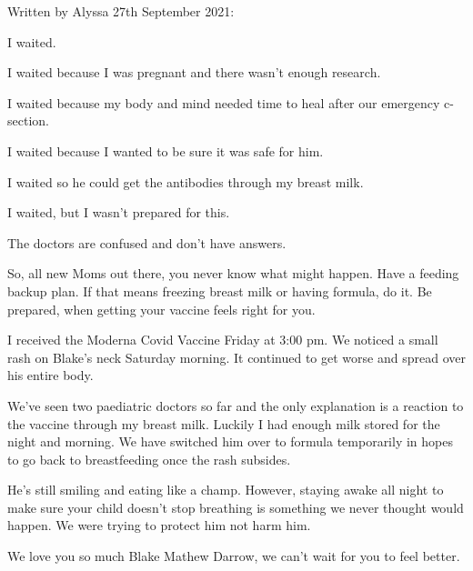 Written by Alyssa 27th September 2021:

I waited.

I waited because I was pregnant and there wasn’t enough research.

I waited because my body and mind needed time to heal after our emergency c-section.

I waited because I wanted to be sure it was safe for him.

I waited so he could get the antibodies through my breast milk.

I waited, but I wasn’t prepared for this.

The doctors are confused and don’t have answers.

So, all new Moms out there, you never know what might happen. Have a feeding
backup plan. If that means freezing breast milk or having formula, do it. Be
prepared, when getting your vaccine feels right for you.

I received the Moderna Covid Vaccine Friday at 3:00 pm. We noticed a small rash
on Blake’s neck Saturday morning. It continued to get worse and spread over
his entire body.

We’ve seen two paediatric doctors so far and the only explanation is a
reaction to the vaccine through my breast milk.
Luckily I had enough milk stored for the night and morning. We have switched
him over to formula temporarily in hopes to go back to breastfeeding once the
rash subsides.

He’s still smiling and eating like a champ. However, staying awake all night
to make sure your child doesn’t stop breathing is something we never thought
would happen. We were trying to protect him not harm him.

We love you so much Blake Mathew Darrow, we can’t wait for you to feel better.

